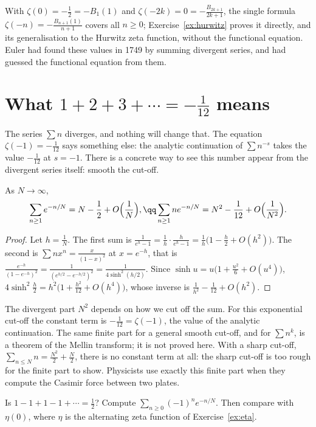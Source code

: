 With $\zeta(0)=-\frac12=-B_1(1)$ and $\zeta(-2k)=0=-\frac{B_{2k+1}}{2k+1}$, the single formula $\zeta(-n)=-\frac{B_{n+1}(1)}{n+1}$ covers all $n\ge0$; Exercise~\ref{ex:hurwitz}
proves it directly, and its generalisation to the Hurwitz zeta function, without the functional equation. Euler had found these
values in 1749 by summing divergent series, and had guessed the functional equation from them.

\section{What $1+2+3+\cdots=-\frac1{12}$ means}

The series $\sum n$ diverges, and nothing will change that. The equation $\zeta(-1)=-\frac1{12}$ says something else: the analytic continuation of
$\sum n^{-s}$ takes the value $-\frac1{12}$ at $s=-1$. There is a concrete way to see this number appear from the divergent series itself:
smooth the cut-off.

\begin{proposition}\label{prop:smoothed}
As $N\to\infty$,
\[
\begin{gathered}\sum_{n\ge1}e^{-n/N}=N-\frac12+O\Bigl(\frac1N\Bigr),\qq\sum_{n\ge1}ne^{-n/N}=N^2-\frac1{12}+O\Bigl(\frac1{N^2}\Bigr).\end{gathered}
\]
\end{proposition}
\begin{proof}
Let $h=\frac1N$. The first sum is $\frac1{e^h-1}=\frac1h\cdot\frac h{e^h-1}=\frac1h\bigl(1-\frac h2+O(h^2)\bigr)$. The second is $\sum nx^n=\frac x{(1-x)^2}$ at $x=e^{-h}$, that is
$\frac{e^{-h}}{(1-e^{-h})^2}=\frac1{(e^{h/2}-e^{-h/2})^2}=\frac1{4\sinh^2(h/2)}$. Since $\sinh u=u\bigl(1+\frac{u^2}6+O(u^4)\bigr)$, $4\sinh^2\frac h2=h^2\bigl(1+\frac{h^2}{12}+O(h^4)\bigr)$, whose inverse is
$\frac1{h^2}-\frac1{12}+O(h^2)$.
\end{proof}

The divergent part $N^2$ depends on how we cut off the sum. For this exponential cut-off the constant term is $-\frac1{12}=\zeta(-1)$, the value of the analytic continuation. The same finite part for a general smooth cut-off, and for $\sum n^k$, is a theorem of the Mellin transform; it is not proved here. With a sharp cut-off, $\sum_{n\le N}n=\frac{N^2}2+\frac N2$, there is no constant
term at all: the sharp cut-off is too rough for the finite part to show. Physicists use exactly this finite part when they
compute the Casimir force between two plates.

\begin{think}
Is $1-1+1-1+\cdots=\frac12$? Compute $\sum_{n\ge0}(-1)^ne^{-n/N}$. Then compare with $\eta(0)$, where $\eta$ is the alternating zeta function of
Exercise~\ref{ex:eta}.
\end{think}

